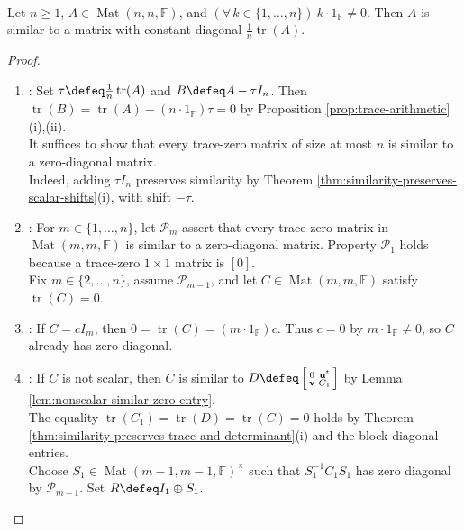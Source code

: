 \begin{theorem} \label{thm:similar-to-constant-diagonal} \\
Let $n\geq1$, $A\in\operatorname{Mat}(n,n,\mathbb{F})$, and $(\forall\,k\in\{1,\ldots,n\})\ k\cdot1_{\mathbb{F}}\neq0$. Then $A$ is similar to a matrix with constant diagonal $\frac{1}{n}\operatorname{tr}(A)$.
\begin{proof}
\begin{enumerate}[label=(\roman*)]
\setlength{\itemsep}{0pt}
\item {}: Set $\tau\defeq\frac{1}{n}\operatorname{tr}(A)$ and $B\defeq A-\tau I_n$. Then $\operatorname{tr}(B)=\operatorname{tr}(A)-(n\cdot1_{\mathbb{F}})\tau=0$ by Proposition \ref{prop:trace-arithmetic}(i),(ii).\\
It suffices to show that every trace-zero matrix of size at most $n$ is similar to a zero-diagonal matrix.\\
Indeed, adding $\tau I_n$ preserves similarity by Theorem \ref{thm:similarity-preserves-scalar-shifts}(i), with shift $-\tau$.
\item {}: For $m\in\{1,\ldots,n\}$, let $\mathcal{P}_m$ assert that every trace-zero matrix in $\operatorname{Mat}(m,m,\mathbb{F})$ is similar to a zero-diagonal matrix. Property $\mathcal{P}_1$ holds because a trace-zero $1\times1$ matrix is $[0]$.\\
Fix $m\in\{2,\ldots,n\}$, assume $\mathcal{P}_{m-1}$, and let $C\in\operatorname{Mat}(m,m,\mathbb{F})$ satisfy $\operatorname{tr}(C)=0$.
\item {}: If $C=cI_m$, then $0=\operatorname{tr}(C)=(m\cdot1_{\mathbb{F}})c$. Thus $c=0$ by $m\cdot1_{\mathbb{F}}\neq0$, so $C$ already has zero diagonal.
\item {}: If $C$ is not scalar, then $C$ is similar to $D\defeq\left[\begin{smallmatrix}0&\mathbf{u}^t\\ \mathbf{v}&C_1\end{smallmatrix}\right]$ by Lemma \ref{lem:nonscalar-similar-zero-entry}.\\
The equality $\operatorname{tr}(C_1)=\operatorname{tr}(D)=\operatorname{tr}(C)=0$ holds by Theorem \ref{thm:similarity-preserves-trace-and-determinant}(i) and the block diagonal entries.\\
Choose $S_1\in\operatorname{Mat}(m-1,m-1,\mathbb{F})^{\times}$ such that $S_1^{-1}C_1S_1$ has zero diagonal by $\mathcal{P}_{m-1}$. Set $R\defeq I_1\oplus S_1$.\\

\end{enumerate}
\end{proof}
\end{theorem}
